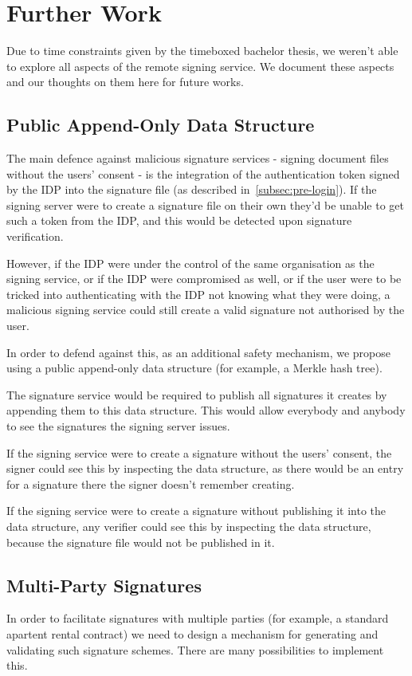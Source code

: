 \chapter{Further Work}\label{ch:further-work}
Due to time constraints given by the timeboxed bachelor thesis, we weren't able to explore all aspects of the remote signing service.
We document these aspects and our thoughts on them here for future works.

\section{Public Append-Only Data Structure}\label{sec:public-append-only-data-structure}
The main defence against malicious signature services -
signing document files without the users' consent -
is the integration of the authentication token signed by the \gls{IDP} into the signature file (as described in~\ref{subsec:pre-login}).
If the signing server were to create a signature file on their own they'd be unable to get such a token from the \gls{IDP}, and this would be detected upon signature verification.

However, if the \gls{IDP} were under the control of the same organisation as the signing service,
or if the \gls{IDP} were compromised as well,
or if the user were to be tricked into authenticating with the \gls{IDP} not knowing what they were doing,
a malicious signing service could still create a valid signature not authorised by the user.

In order to defend against this,
as an additional safety mechanism,
we propose using a public append-only data structure (for example, a Merkle hash tree).

The signature service would be required to publish all signatures it creates by appending them to this data structure.
This would allow everybody and anybody to see the signatures the signing server issues.

If the signing service were to create a signature without the users' consent,
the signer could see this by inspecting the data structure,
as there would be an entry for a signature there the signer doesn't remember creating.

If the signing service were to create a signature without publishing it into the data structure,
any verifier could see this by inspecting the data structure,
because the signature file would not be published in it.


\section{Multi-Party Signatures}\label{sec:multi-party-signatures}
In order to facilitate signatures with multiple parties (for example, a standard apartent rental contract) we need to design a mechanism for generating and validating such signature schemes.
There are many possibilities to implement this.

